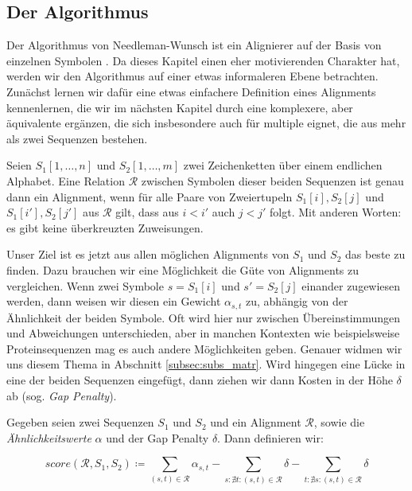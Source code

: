 \subsection{Der Algorithmus}

Der Algorithmus von Needleman-Wunsch ist ein Alignierer auf der Basis von einzelnen Symbolen \citep{nw70}. Da dieses Kapitel einen eher motivierenden Charakter hat, werden wir den Algorithmus auf einer etwas informaleren Ebene betrachten. Zunächst lernen wir dafür eine etwas einfachere Definition eines Alignments kennenlernen, die wir im nächsten Kapitel durch eine komplexere, aber äquivalente ergänzen, die sich insbesondere auch für multiple eignet, die aus mehr als zwei Sequenzen bestehen.

\begin{definition}
	Seien $S_1[1,\dots, n]$ und $S_2[1,\dots,m]$ zwei Zeichenketten über einem endlichen Alphabet. Eine Relation $\mathcal{R}$ zwischen Symbolen dieser beiden Sequenzen ist genau dann ein Alignment, wenn für alle Paare von Zweiertupeln $S_1[i],S_2[j]$ und $S_1[i'],S_2[j']$ aus $\mathcal{R}$ gilt, dass aus $i < i'$ auch $j < j'$ folgt. Mit anderen Worten: es gibt keine überkreuzten Zuweisungen.
\end{definition}

Unser Ziel ist es jetzt aus allen möglichen Alignments von $S_1$ und $S_2$ das beste zu finden. Dazu brauchen wir eine Möglichkeit die Güte von Alignments zu vergleichen. Wenn zwei Symbole $s = S_1[i]$ und $s' = S_2[j]$ einander zugewiesen werden, dann weisen wir diesen ein Gewicht $\alpha_{s,t}$ zu, abhängig von der Ähnlichkeit der beiden Symbole. Oft wird hier nur zwischen Übereinstimmungen und Abweichungen unterschieden, aber in manchen Kontexten wie beispielsweise Proteinsequenzen mag es auch andere Möglichkeiten geben. Genauer widmen wir uns diesem Thema in Abschnitt \ref{subsec:subs_matr}. Wird hingegen eine Lücke in eine der beiden Sequenzen eingefügt, dann ziehen wir dann Kosten in der Höhe $\delta$ ab (sog. \emph{Gap Penalty}).

\begin{definition}
	Gegeben seien zwei Sequenzen $S_1$ und $S_2$ und ein Alignment $\mathcal{R}$, sowie die \emph{Ähnlichkeitswerte} $\alpha$ und  der Gap Penalty $\delta$. Dann definieren wir:
	
	\begin{equation}
		score(\mathcal{R},S_1,S_2) \coloneqq \sum_{(s,t)\in \mathcal{R}}{\alpha_{s,t}} - \sum_{s : \nexists t : (s,t)\in \mathcal{R}}{\delta} - \sum_{t : \nexists s : (s,t)\in \mathcal{R}}{\delta}
	\end{equation}
\end{definition}

